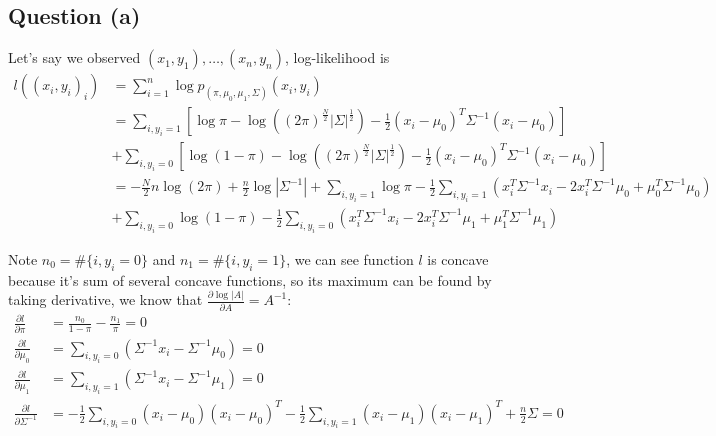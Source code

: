 \documentclass{article}
\newcommand{\pd}[2]{\frac{\partial {#1}}{\partial {#2}}}
\begin{document}
	\subsection{Question (a)}
	Let's say we observed $(x_1,y_1), \dots, (x_n,y_n)$, log-likelihood is
	\begin{equation*}
	\begin{split}
	l((x_i,y_i)_i) &= \sum_{i=1}^n \log p_{(\pi,\mu_0,\mu_1,\Sigma)}(x_i,y_i)\\
	&=\sum_{i,y_i=1} [\log \pi -\log((2\pi)^\frac{N}{2} |\Sigma|^\frac{1}{2}) - \frac{1}{2} (x_i-\mu_0)^T \Sigma^{-1} (x_i-\mu_0) ]\\
	&+\sum_{i,y_i=0} [\log (1-\pi) -\log((2\pi)^\frac{N}{2} |\Sigma|^\frac{1}{2}) - \frac{1}{2} (x_i-\mu_0)^T \Sigma^{-1} (x_i-\mu_0) ]\\
	&= - \frac{N}{2} n \log(2\pi) + \frac{n}{2} \log|\Sigma^{-1}| + \sum_{i,y_i=1} \log \pi -\frac{1}{2} \sum_{i,y_i=1}(x_i^T\Sigma^{-1}x_i-2x_i^T\Sigma^{-1}\mu_0+\mu_0^T\Sigma^{-1}\mu_0)\\
	&+ \sum_{i,y_i=0} \log (1-\pi) -\frac{1}{2} \sum_{i,y_i=0}(x_i^T\Sigma^{-1}x_i-2x_i^T\Sigma^{-1}\mu_1+\mu_1^T\Sigma^{-1}\mu_1)
	\end{split}
	\end{equation*}
	
	Note $n_0 = \#\{i,y_i=0\}$ and $n_1 = \#\{i,y_i=1\}$, we can see function $l$ is concave because it's sum of several concave functions, so its maximum can be found by taking derivative, we know that $\pd{\log|A|}{A} = A^{-1}$:
	\begin{equation*}
	\begin{split}
	\pd{l}{\pi} &= \frac{n_0}{1-\pi} - \frac{n_1}{\pi} = 0\\
	\pd{l}{\mu_0} &= \sum_{i,y_i=0} (\Sigma^{-1} x_i - \Sigma^{-1} \mu_0) = 0\\
	\pd{l}{\mu_1} &= \sum_{i,y_i=1} (\Sigma^{-1} x_i - \Sigma^{-1} \mu_1) = 0\\
	\pd{l}{\Sigma^{-1}} &=  -\frac{1}{2} \sum_{i,y_i=0} (x_i-\mu_0) (x_i-\mu_0)^T -\frac{1}{2} \sum_{i,y_i=1} (x_i-\mu_1) (x_i-\mu_1)^T + \frac{n}{2} \Sigma = 0
	\end{split}
	\end{equation*}
	
\end{document}
